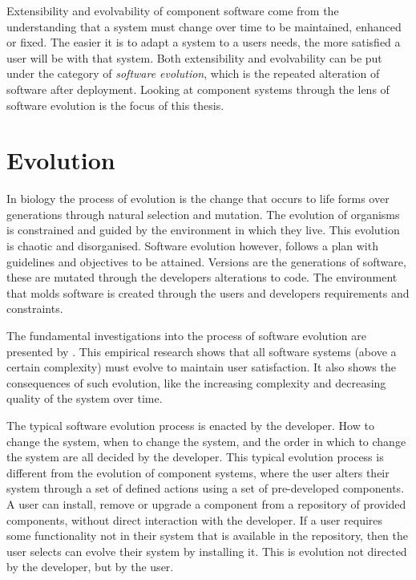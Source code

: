 Extensibility and evolvability of component software come from the understanding that a system must change over time to be maintained, enhanced or fixed.
The easier it is to adapt a system to a users needs, the more satisfied a user will be with that system.
Both extensibility and evolvability can be put under the category of \textit{software evolution}, which is the repeated alteration of software after deployment.
Looking at component systems through the lens of software evolution is the focus of this thesis.

\section{Evolution}
In biology the process of evolution is the change that occurs to life forms over generations through natural selection and mutation.
The evolution of organisms is constrained and guided by the environment in which they live.
This evolution is chaotic and disorganised.
Software evolution however, follows a plan with guidelines and objectives to be attained.
Versions are the generations of software, these are mutated through the developers alterations to code.
The environment that molds software is created through the users and developers requirements and constraints.

The fundamental investigations into the process of software evolution are presented by \cite{lehman1980}.
This empirical research shows that all software systems (above a certain complexity) must evolve to maintain user satisfaction.
It also shows the consequences of such evolution, like the increasing complexity and decreasing quality of the system over time.

The typical software evolution process is enacted by the developer.
How to change the system, when to change the system, and the order in which to change the system are all decided by the developer.
This typical evolution process is different from the evolution of component systems, 
where the user alters their system through a set of defined actions using a set of pre-developed components.
A user can install, remove or upgrade a component from a repository of provided components, without direct interaction with the developer.
If a user requires some functionality not in their system that is available in the repository, then the user selects can evolve their system by installing it.
This is evolution not directed by the developer, but by the user. 

